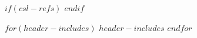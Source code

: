 $if(csl-refs)$
\NewDocumentCommand\citeproctext{}{}
\NewDocumentCommand{}
\makeatletter
\let\@cite@ofmt\@firstofone
\def\@biblabel#1{}
\def\@cite#1#2{{#1\if@tempswa , #2\fi}}
\makeatother
\newlength{\cslhangindent}
\setlength{\cslhangindent}{1.5em}
\newlength{\csllabelwidth}
\setlength{\csllabelwidth}{3em}
\newlength{\cslentryspacingunit}
\setlength{\cslentryspacingunit}{\parskip}
\newenvironment{CSLReferences}[2]
 {\begin{list}{}{%
  \setlength{\itemindent}{0pt}
  \setlength{\leftmargin}{0pt}
  \setlength{\parsep}{0pt}
  \ifodd #1
  \setlength{\leftmargin}{\cslhangindent}
  \setlength{\itemindent}{-1\cslhangindent}
  \fi
  \setlength{\itemsep}{#2\cslentryspacingunit}}}
 {\end{list}}
\newcommand{\CSLBlock}[1]{\hfill\break\parbox[t]{\linewidth}{\strut\ignorespaces#1\strut}}
\newcommand{\CSLLeftMargin}[1]{\parbox[t]{\csllabelwidth}{\strut#1\strut}}
\newcommand{\CSLRightInline}[1]{\parbox[t]{\linewidth - \csllabelwidth}{\strut#1\strut}}
\newcommand{\CSLIndent}[1]{\hspace{\cslhangindent}#1}
$endif$

$for(header-includes)$
$header-includes$
$endfor$
